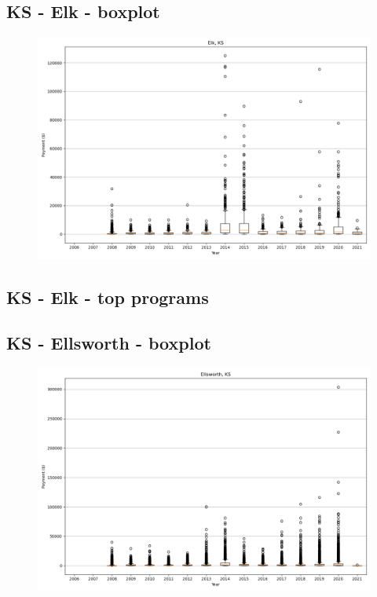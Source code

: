 \subsection*{KS - Elk - boxplot}
\begin{figure}[h]
\centering
\includegraphics[width=7in]{../output/boxplots/counties/Elk-KS_boxplot.png}
\end{figure}


\subsection*{KS - Elk - top programs}

\newpage
\subsection*{KS - Ellsworth - boxplot}
\begin{figure}[h]
\centering
\includegraphics[width=7in]{../output/boxplots/counties/Ellsworth-KS_boxplot.png}
\end{figure}


